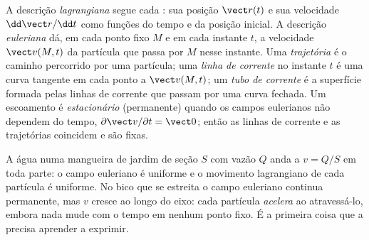 \begin{definition}\label{def:b2:fluid-kinematics:euler}
A descrição \emph{lagrangiana} segue cada : sua
posição $\vect r(t)$ e sua velocidade $\dd\vect r/\dd t$ como funções do tempo
e da posição inicial. A descrição \emph{euleriana} dá, em
cada ponto fixo $M$ e em cada instante $t$, a velocidade $\vect v(M, t)$ da
partícula que passa por $M$ nesse instante. Uma \emph{trajetória}
é o caminho percorrido por uma partícula; uma \emph{linha de corrente} no instante $t$ é uma
curva tangente em cada ponto a $\vect v(M, t)$; um \emph{tubo de corrente} é
a superfície formada pelas linhas de corrente que passam por uma curva fechada. Um escoamento é
\emph{estacionário} (permanente) quando os campos eulerianos não dependem do
tempo, $\partial\vect v/\partial t = \vect 0$; então as linhas de corrente e as trajetórias
coincidem e são fixas.
\end{definition}

\begin{example}\label{ex:b2:fluid-kinematics:hose}
A água numa mangueira de jardim de seção $S$ com vazão $Q$ anda a $v = Q/S$
em toda parte: o campo euleriano é uniforme e o movimento lagrangiano de
cada partícula é uniforme. No bico que se estreita o campo euleriano
continua permanente, mas $v$ cresce ao longo do eixo: cada partícula
\emph{acelera} ao atravessá-lo, embora nada mude com o tempo em nenhum
ponto fixo. É a primeira coisa que a 
precisa aprender a exprimir.
\end{example}

